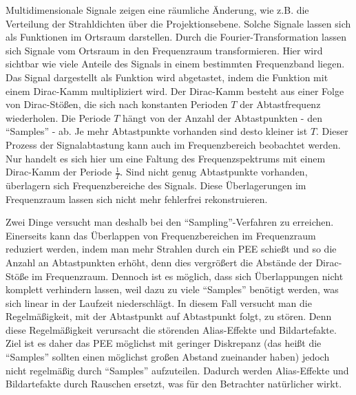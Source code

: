 Multidimensionale Signale zeigen eine räumliche Änderung, wie z.B. die Verteilung der Strahldichten über die Projektionsebene. Solche Signale lassen sich als Funktionen im Ortsraum darstellen. Durch die Fourier-Transformation lassen sich Signale vom Ortsraum in den Frequenzraum transformieren. Hier wird sichtbar wie viele Anteile des Signals in einem bestimmten Frequenzband liegen. Das Signal dargestellt als Funktion wird abgetastet, indem die Funktion mit einem Dirac-Kamm multipliziert wird. Der Dirac-Kamm besteht aus einer Folge von Dirac-Stößen, die sich nach konstanten Perioden \( T \) der Abtastfrequenz wiederholen. Die Periode \( T \) hängt von der Anzahl der Abtastpunkten - den "`Samples"' - ab. Je mehr Abtastpunkte vorhanden sind desto kleiner ist \( T \). Dieser Prozess der Signalabtastung kann auch im Frequenzbereich beobachtet werden. Nur handelt es sich hier um eine Faltung des Frequenzspektrums mit einem Dirac-Kamm der Periode \( \frac{1}{T} \). Sind nicht genug Abtastpunkte vorhanden, überlagern sich Frequenzbereiche des Signals. Diese Überlagerungen im Frequenzraum lassen sich nicht mehr fehlerfrei rekonstruieren.

Zwei Dinge versucht man deshalb bei den "`Sampling"'-Verfahren zu erreichen.
Einerseits kann das Überlappen von Frequenzbereichen im Frequenzraum reduziert werden, indem man mehr Strahlen durch ein PEE schießt und so die Anzahl an Abtastpunkten erhöht, denn dies vergrößert die Abstände der Dirac-Stöße im Frequenzraum. Dennoch ist es möglich, dass sich Überlappungen nicht komplett verhindern lassen, weil dazu zu viele "`Samples"' benötigt werden, was sich linear in der Laufzeit niederschlägt. In diesem Fall versucht man die Regelmäßigkeit, mit der Abtastpunkt auf Abtastpunkt folgt, zu stören. Denn diese Regelmäßigkeit verursacht die störenden Alias-Effekte und Bildartefakte. Ziel ist es daher das PEE möglichst mit geringer Diskrepanz (das heißt die "`Samples"' sollten einen möglichst großen Abstand zueinander haben) jedoch nicht regelmäßig durch "`Samples"' aufzuteilen. Dadurch werden Alias-Effekte und Bildartefakte durch Rauschen ersetzt, was für den Betrachter natürlicher wirkt.


